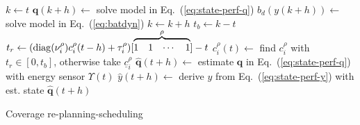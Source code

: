 \documentclass[letterpaper,10pt,conference,twoside]{IEEEtran}
\theoremstyle{definition}
\begin{document}
\begin{algorithm}[t]
\begin{algorithmic}[1]
      \vspace*{.8ex}
      \color{black}\STATE $k\gets t$\vspace*{.3ex}\label{alg:bat1}
      \vspace*{.3ex}
          \STATE $\mathbf{q}(k+h)\gets${ solve model in Eq.~(\ref{eq:state-perf-q})}\vspace*{.3ex}\label{alg:evol}
        \ENDIF
        \STATE $b_d(y(k+h))\gets${ solve model in Eq.~(\ref{eq:batdyn})}\vspace*{.3ex}
        \STATE $k\gets k+h$\vspace*{.3ex}
      \ENDWHILE
      \STATE $t_b\gets k-t$\vspace*{.3ex}\label{alg:bat2}
      \vspace*{-2.4ex}
      \color{black}\STATE $t_r\gets (\mathrm{diag}(\nu_i^\rho)\vspace*{.3ex}c_i^\rho(t-h)+\tau_i^\rho)[\overbrace{\begin{matrix}1&1&\cdots&1\end{matrix}}^{\rho}]-t$\vspace*{.3ex}\label{alg:traj1}
        \color{black}\STATE $c_i^{\rho}(t)\gets${ find }$c_i^{\rho}${ with }$t_r\in[0,t_b]${, otherwise take }$\underline{c}_i^\rho$\vspace*{.3ex}\label{alg:traj2}
      \color{black}\ENDIF
      \vspace*{.8ex}
      \color{black}\STATE $\hat{\mathbf{q}}(t+h)\gets${ estimate }$\mathbf{q}${ in Eq.~(\ref{eq:state-perf-q}) with energy sensor }$\Upsilon(t)$\vspace*{-1.8ex}\label{alg:klm1}
      \color{black}\STATE $\hat{y}(t+h)\gets${ derive }$y${ from Eq.~(\ref{eq:state-perf-y}) with est. state }$\hat{\mathbf{q}}(t+h)$%
      \label{alg:klm2}
    \ENDFOR
  \end{algorithmic}
  \caption{Coverage re-planning-scheduling}\label{alg}
\end{algorithm}
\end{document}
